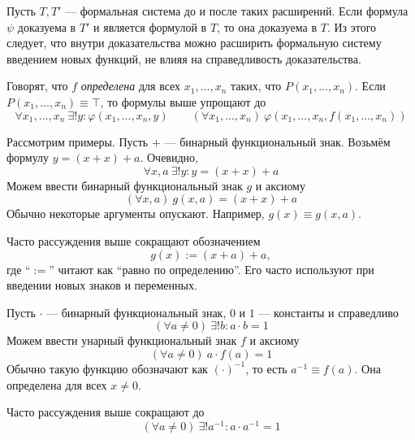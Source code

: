 Пусть $T,T'$ --- формальная система до и после таких расширений.
Если формула $\psi$ доказуема в $T'$ и является формулой в $T$, то она доказуема в $T$.
Из этого следует, что внутри доказательства можно расширить формальную систему
введением новых функций, не влияя на справедливость доказательства.

Говорят, что $f$ {\it определена}
для всех $x_1,...,x_{n}$ таких, что $P(x_1,...,x_{n})$.
Если $P(x_1,...,x_{n})\equiv \top$, то формулы выше упрощают до
\[
  \forall x_1,...,x_{n}~\exists !y:\varphi(x_1,...,x_{n},y)\qquad
  (\forall x_1,...,x_{n})~\varphi(x_1,...,x_{n},f(x_1,...,x_{n}))
\]

Рассмотрим примеры.
Пусть $+$ --- бинарный функциональный знак.
Возьмём формулу ${y=(x+x)+a}$. Очевидно,
\[
  \forall x,a~\exists !y:y=(x+x)+a
\]
Можем ввести бинарный функциональный знак $g$ и аксиому
\[
  (\forall x,a)~g(x,a)=(x+x)+a
\]
Обычно некоторые аргументы опускают. Например, $g(x)\equiv g(x,a)$.

Часто рассуждения выше сокращают обозначением
\[
  g(x):=(x+a)+a,
\]
где ``$:=$'' читают как ``равно по определению''.
Его часто используют при введении новых знаков и переменных.

Пусть $\cdot$ --- бинарный функциональный знак,
$0$ и $1$ --- константы и справедливо
\[
  (\forall a\neq 0)~\exists !b:a\cdot b=1
\]
Можем ввести унарный функциональный знак $f$ и аксиому
\[
  (\forall a\neq 0)~a\cdot f(a)=1
\]
Обычно такую функцию обозначают как $(\cdot)^{-1}$,
то есть $a^{-1}\equiv f(a)$.
Она определена для всех $x\neq 0$.

Часто рассуждения выше сокращают до
\[
  (\forall a\neq 0)~\exists !a^{-1}:a\cdot a^{-1}=1
\]
